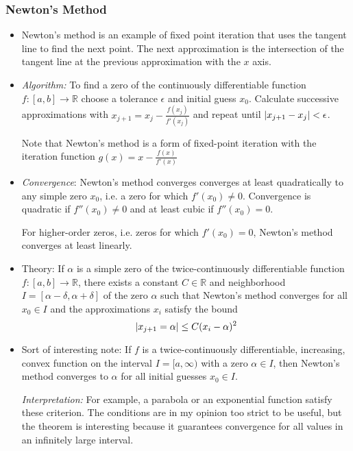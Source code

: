\documentclass[11pt, a4paper]{article}
\newcommand{\R}{\mathbb{R}} %
\begin{document}
\subsubsection{Newton's Method}
\begin{itemize}
	\item Newton's method is an example of fixed point iteration that uses the tangent line to find the next point. The next approximation is the intersection of the tangent line at the previous approximation with the $ x $ axis.
	
	\item \textit{Algorithm:} To find a zero of the continuously differentiable function $ f:[a, b] \to \R $ choose a tolerance $ \epsilon $ and initial guess $ x_{0} $. Calculate successive approximations with $ x_{j+1} = x_{j} - \frac{f(x_{j})}{f'(x_{j})} $ and repeat until $ \abs{x_{j+1} - x_{j}} < \epsilon$.
	
	\smallskip
	Note that Newton's method is a form of fixed-point iteration with the iteration function $ g(x) = x - \frac{f(x)}{f'(x)} $

	
	\item \textit{Convergence}: Newton's method converges converges at least quadratically to any simple zero $ x_{0} $, i.e. a zero for which $ f'(x_{0}) \neq 0 $. Convergence is quadratic if $ f''(x_{0}) \neq 0 $ and at least cubic if $ f''(x_{0}) = 0 $.
	
	For higher-order zeros, i.e. zeros for which $ f'(x_{0}) = 0$, Newton's method converges at least linearly.
	
	\item Theory: If $ \alpha $ is a simple zero of the twice-continuously differentiable function $ f:[a, b] \to \R $, there exists a constant $ C \in \R $ and neighborhood $ I = [\alpha - \delta, \alpha + \delta] $ of the zero $ \alpha $ such that Newton's method converges for all $ x_{0} \in I $ and the approximations $ x_{i} $ satisfy the bound
	\begin{equation*}
		\abs{x_{j+1} = \alpha} \leq C(x_{i} - \alpha)^{2}
	\end{equation*}
	
	\item Sort of interesting note: If $ f $ is a twice-continuously differentiable, increasing, convex function on the interval $ I = [a, \infty) $ with a zero $ \alpha \in I $, then Newton's method converges to $ \alpha $ for all initial guesses $ x_{0} \in I $.
	
	\textit{Interpretation:} For example, a parabola or an exponential function satisfy these criterion. The conditions are in my opinion too strict to be useful, but the theorem is interesting because it guarantees convergence for all values in an infinitely large interval.
	
	
\end{itemize}
\end{document}
